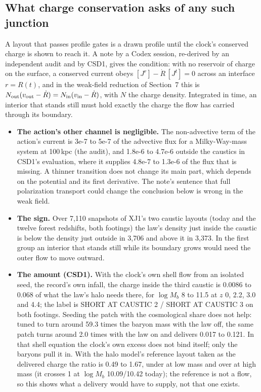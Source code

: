 \documentclass[10pt]{article}
\begin{document}
\subsection{What charge conservation asks of any such junction}
A layout that passes profile gates is a drawn profile until the clock's conserved charge is shown to reach it. A note by a Codex session, re-derived by an independent audit and by CSD1, gives the condition: with no reservoir of charge on the surface, a conserved current obeys $[J^r]-\dot R\,[J^t]=0$ across an interface $r=R(t)$, and in the weak-field reduction of Section~7 this is $N_{\rm out}(v_{\rm out}-\dot R)=N_{\rm in}(v_{\rm in}-\dot R)$, with $N$ the charge density. Integrated in time, an interior that stands still must hold exactly the charge the flow has carried through its boundary.
\begin{itemize}
\item \textbf{The action's other channel is negligible.} The non-advective term of the action's current is 3e-7 to 5e-7 of the advective flux for a Milky-Way-mass system at 100\,kpc (the audit), and 1.8e-6 to 4.7e-6 outside the caustics in CSD1's evaluation, where it supplies 4.8e-7 to 1.3e-6 of the flux that is missing. A thinner transition does not change its main part, which depends on the potential and its first derivative. The note's sentence that full polarization transport could change the conclusion below is wrong in the weak field.
\item \textbf{The sign.} Over 7,110 snapshots of XJ1's two caustic layouts (today and the twelve forest redshifts, both footings) the law's density just inside the caustic is below the density just outside in 3,706 and above it in 3,373. In the first group an interior that stands still while its boundary grows would need the outer flow to move outward.
\item \textbf{The amount (CSD1).} With the clock's own shell flow from an isolated seed, the record's own infall, the charge inside the third caustic is 0.0086 to 0.068 of what the law's halo needs there, for $\log M_b$ 8 to 11.5 at $z$ 0, 2.2, 3.0 and 4.4; the label is SHORT AT CAUSTIC 2 / SHORT AT CAUSTIC 3 on both footings. Seeding the patch with the cosmological share does not help: tuned to turn around 59.3 times the baryon mass with the law off, the same patch turns around 2.0 times with the law on and delivers 0.017 to 0.121. In that shell equation the clock's own excess does not bind itself; only the baryons pull it in. With the halo model's reference layout taken as the delivered charge the ratio is 0.49 to 1.67, under at low mass and over at high mass (it crosses 1 at $\log M_b$ 10.09/10.42 today); the reference is not a flow, so this shows what a delivery would have to supply, not that one exists.

\end{itemize}
\end{document}
